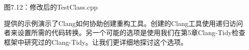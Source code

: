 \begin{center}
图7.12：修改后的TestClass.cpp
\end{center}

提供的示例演示了Clang如何协助创建重构工具。创建的Clang工具使用递归访问者来设置所需的代码转换。另一个可能的选项是使用我们在第5章Clang-Tidy检查框架中研究过的Clang-Tidy。让我们更详细地探讨这个选项。




















































